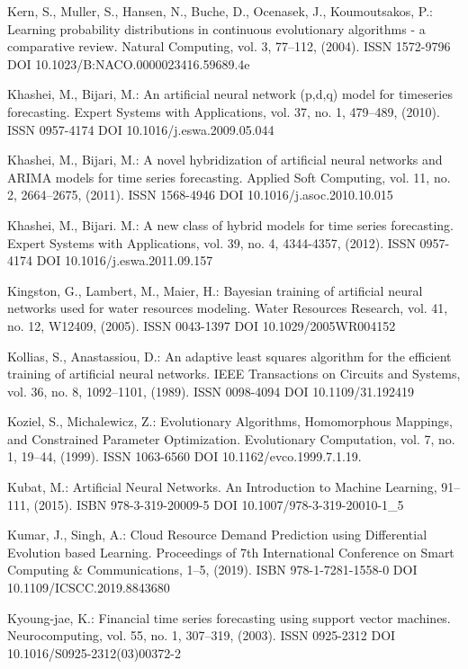 \begin{thebibliography}{99.}
 Kern, S., Muller, S., Hansen, N., Buche, D., Ocenasek, J., Koumoutsakos, P.: Learning probability distributions in continuous evolutionary algorithms - a comparative review. Natural Computing, vol. 3, 77--112, (2004). ISSN 1572-9796 DOI 10.1023/B:NACO.0000023416.59689.4e

 Khashei, M., Bijari, M.: An artificial neural network (p,d,q) model for timeseries forecasting. Expert Systems with Applications, vol. 37, no. 1, 479--489, (2010). ISSN 0957-4174 DOI 10.1016/j.eswa.2009.05.044

 Khashei, M., Bijari, M.: A novel hybridization of artificial neural networks and ARIMA models for time series forecasting. Applied Soft Computing, vol. 11, no. 2, 2664--2675, (2011). ISSN 1568-4946 DOI 10.1016/j.asoc.2010.10.015

 Khashei, M., Bijari. M.: A new class of hybrid models for time series forecasting. Expert Systems with Applications, vol. 39, no. 4, 4344-4357, (2012). ISSN 0957-4174 DOI 10.1016/j.eswa.2011.09.157

 Kingston, G., Lambert, M., Maier, H.: Bayesian training of artificial neural networks used for water resources modeling. Water Resources Research, vol. 41, no. 12, W12409, (2005). ISSN 0043-1397 DOI 10.1029/2005WR004152

 Kollias, S., Anastassiou, D.: An adaptive least squares algorithm for the efficient training of artificial neural networks. IEEE Transactions on Circuits and Systems, vol. 36, no. 8, 1092--1101, (1989). ISSN 0098-4094 DOI 10.1109/31.192419

 Koziel, S., Michalewicz, Z.: Evolutionary Algorithms, Homomorphous Mappings, and Constrained Parameter Optimization. Evolutionary Computation, vol. 7, no. 1, 19--44, (1999). ISSN 1063-6560 DOI 10.1162/evco.1999.7.1.19.

 Kubat, M.: Artificial Neural Networks. An Introduction to Machine Learning, 91--111, (2015). ISBN 978-3-319-20009-5 DOI 10.1007/978-3-319-20010-1\_5

 Kumar, J., Singh, A.: Cloud Resource Demand Prediction using Differential Evolution based Learning. Proceedings of 7th International Conference on Smart Computing \& Communications, 1--5, (2019). ISBN 978-1-7281-1558-0 DOI 10.1109/ICSCC.2019.8843680

 Kyoung-jae, K.: Financial time series forecasting using support vector machines. Neurocomputing, vol. 55, no. 1, 307--319, (2003). ISSN 0925-2312 DOI 10.1016/S0925-2312(03)00372-2


\end{thebibliography}
